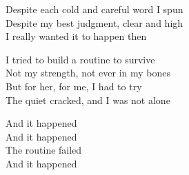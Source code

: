 \begin{lyrics}
Despite each cold and careful word I spun\\
Despite my best judgment, clear and high\\
I really wanted it to happen then

I tried to build a routine to survive\\
Not my strength, not ever in my bones\\
But for her, for me, I had to try\\
The quiet cracked, and I was not alone

And it happened\\
And it happened\\
The routine failed\\
And it happened
\end{lyrics}

